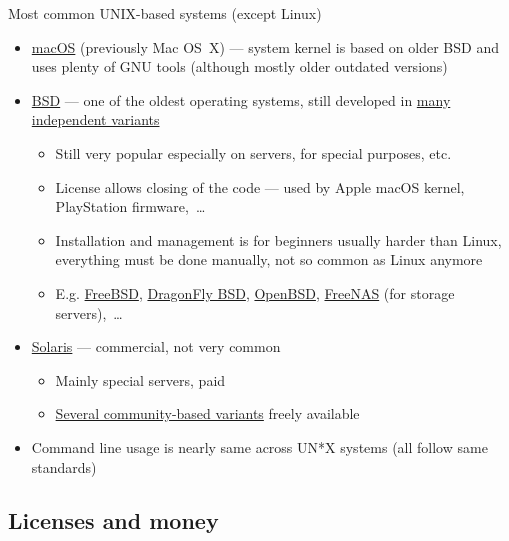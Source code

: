 \documentclass[compress, ucs, xelatex, 11pt, xcolor=svgnames, aspectratio=169,
	hyperref={
		bookmarks=true,
		unicode=true,
		colorlinks=true,
		pdftitle={Linux, command line and MetaCentrum},
		plainpages=false,
		pdfauthor={Vojtech Zeisek},
		pdfsubject={Course about use of Linux command line, writing shell scripts and using MetaCentrum of CESNET},
		pdfcreator={XeLaTeX},
		pdfkeywords={Linux, GNU, BASH, shell, command line, MetaCentrum},
		linkcolor=DarkRed, %
		anchorcolor=DarkBlue, %
		citecolor=Indigo, %
		filecolor=NavyBlue, %
		menucolor=DarkMagenta, %
		urlcolor=DarkBlue, %
		pdftex},
	url={hyphens, lowtilde} %
	]{beamer}
\begin{document}
\begin{frame}{Most common UNIX-based systems (except Linux)}
	\begin{itemize}
		\item \href{https://en.wikipedia.org/wiki/macOS}{macOS} (previously Mac OS~X) --- system kernel is based on older BSD and uses plenty of GNU tools (although mostly older outdated versions)
		\item \href{https://en.wikipedia.org/wiki/Berkeley_Software_Distribution}{BSD} --- one of the oldest operating systems, still developed in \href{https://distrowatch.com/search.php?ostype=BSD}{many independent variants}
		\begin{itemize}
			\item Still very popular especially on servers, for special purposes, etc.
			\item License allows closing of the code --- used by Apple macOS kernel, PlayStation firmware,~\ldots
			\item Installation and management is for beginners usually harder than Linux, everything must be done manually, not so common as Linux anymore
			\item E.g. \href{https://www.freebsd.org/}{FreeBSD}, \href{https://www.dragonflybsd.org/}{DragonFly BSD}, \href{https://www.openbsd.org/}{OpenBSD}, \href{https://www.freenas.org/}{FreeNAS} (for storage servers),~\ldots
		\end{itemize}
		\item \href{https://en.wikipedia.org/wiki/Solaris_(operating_system)}{Solaris} --- commercial, not very common
		\begin{itemize}
			\item Mainly special servers, paid
			\item \href{https://distrowatch.com/search.php?ostype=Solaris}{Several community-based variants} freely available
		\end{itemize}
		\item Command line usage is nearly same across UN*X systems (all follow same standards)
	\end{itemize}
\end{frame}

\subsection{Licenses and money}
\end{document}
